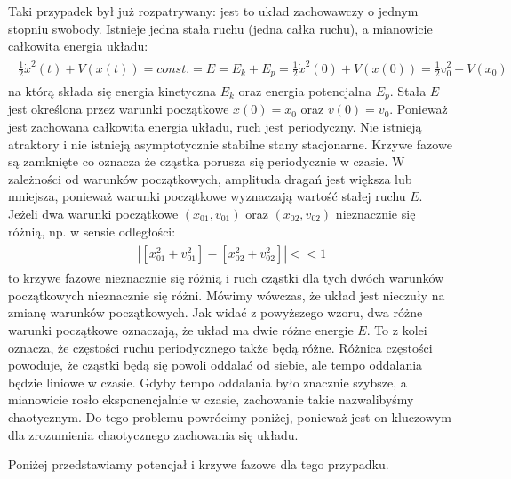 \documentclass[a4paper,12pt,polish]{sphinxmanual}
\begin{document}
Taki przypadek był już rozpatrywany: jest to układ zachowawczy o jednym stopniu swobody. Istnieje jedna stała ruchu (jedna całka ruchu), a mianowicie całkowita energia układu:
\label{ch2/chII011:equation-eqn10}\begin{gather}
\begin{split}\frac{1}{2} \dot x^2(t) + V(x(t)) = const. = E  = E_k + E_p = \frac{1}{2} \dot x^2(0) + V(x(0)) = \frac{1}{2}  v_0^2 + V(x_0)\end{split}\label{ch2/chII011-eqn10}
\end{gather}
na którą składa się energia kinetyczna $E_k$ oraz energia potencjalna $E_p$.  Stała $E$ jest określona przez warunki początkowe $x(0) = x_0$ oraz $v(0) = v_0$.  Ponieważ jest zachowana całkowita energia układu, ruch jest periodyczny. Nie istnieją atraktory i nie istnieją  asymptotycznie stabilne stany stacjonarne. Krzywe fazowe są zamknięte co oznacza że  cząstka porusza się periodycznie w czasie. W zależności od warunków początkowych, amplituda dragań jest większa lub mniejsza, ponieważ warunki początkowe wyznaczają wartość stałej ruchu $E$. Jeżeli dwa warunki początkowe $(x_{01}, v_{01})$  oraz  $(x_{02}, v_{02})$ nieznacznie się różnią, np. w sensie odległości:
\label{ch2/chII011:equation-eqn11}\begin{gather}
\begin{split}| [x_{01}^2 +  v_{01}^2] - [x_{02}^2 +  v_{02}^2] | << 1\end{split}\label{ch2/chII011-eqn11}
\end{gather}
to krzywe fazowe nieznacznie się różnią i ruch cząstki dla tych dwóch warunków początkowych nieznacznie się różni. Mówimy wówczas, że układ jest nieczuły na zmianę warunków początkowych.  Jak widać z powyższego wzoru, dwa różne warunki początkowe oznaczają, że układ ma dwie różne energie $E$. To z kolei oznacza, że częstości ruchu periodycznego także będą różne.  Różnica częstości powoduje, że cząstki  będą się powoli oddalać od siebie, ale tempo oddalania będzie liniowe w czasie.  Gdyby tempo oddalania było znacznie szybsze, a mianowicie rosło eksponencjalnie w czasie, zachowanie takie nazwalibyśmy chaotycznym.  Do tego problemu powrócimy poniżej, ponieważ jest on kluczowym dla zrozumienia chaotycznego zachowania się układu.

Poniżej przedstawiamy potencjał i  krzywe fazowe dla tego przypadku.
\end{document}
